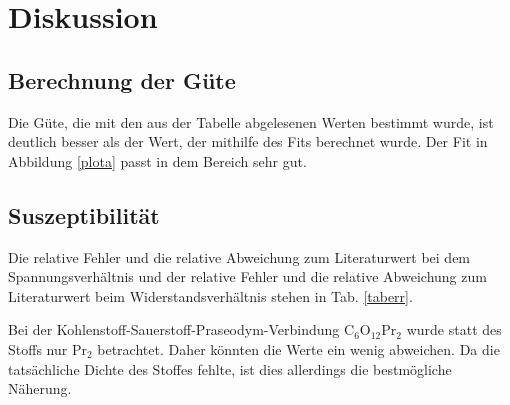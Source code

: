 \section{Diskussion}
\label{sec:Diskussion}

\subsection{Berechnung der Güte}
Die Güte, die mit den aus der Tabelle abgelesenen Werten bestimmt wurde, ist deutlich besser als der Wert, der mithilfe des Fits berechnet wurde.
\newline
Der Fit in Abbildung \ref{plota} passt in dem Bereich sehr gut.


\subsection{Suszeptibilität}
Die relative Fehler und die relative Abweichung zum Literaturwert bei dem Spannungsverhältnis und der relative Fehler und die relative Abweichung zum Literaturwert beim Widerstandsverhältnis stehen in Tab. \ref{taberr}. 


\noindent Bei der Kohlenstoff-Sauerstoff-Praseodym-Verbindung $\text{C}_6 \text{O}_{12} \text{Pr}_2$ wurde statt des Stoffs nur $\text{Pr}_2$ betrachtet. Daher könnten die Werte ein wenig abweichen. Da die tatsächliche Dichte des Stoffes fehlte, ist dies allerdings die bestmögliche Näherung.


